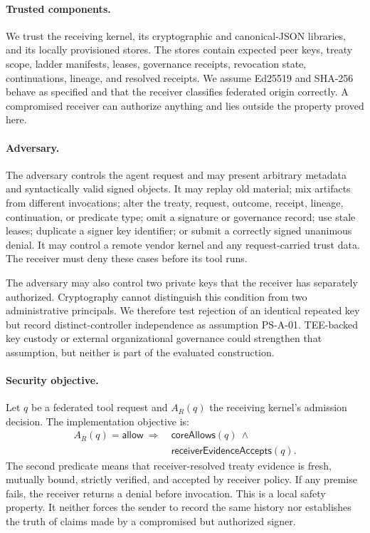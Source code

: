 \paragraph{Trusted components.}
We trust the receiving kernel, its cryptographic and canonical-JSON libraries, and its locally provisioned stores. The stores contain expected peer keys, treaty scope, ladder manifests, leases, governance receipts, revocation state, continuations, lineage, and resolved receipts. We assume Ed25519 and SHA-256 behave as specified and that the receiver classifies federated origin correctly. A compromised receiver can authorize anything and lies outside the property proved here.

\paragraph{Adversary.}
The adversary controls the agent request and may present arbitrary metadata and syntactically valid signed objects. It may replay old material; mix artifacts from different invocations; alter the treaty, request, outcome, receipt, lineage, continuation, or predicate type; omit a signature or governance record; use stale leases; duplicate a signer key identifier; or submit a correctly signed unanimous denial. It may control a remote vendor kernel and any request-carried trust data. The receiver must deny these cases before its tool runs.

The adversary may also control two private keys that the receiver has separately authorized. Cryptography cannot distinguish this condition from two administrative principals. We therefore test rejection of an identical repeated key but record distinct-controller independence as assumption \textsc{PS-A-01}. TEE-backed key custody or external organizational governance could strengthen that assumption, but neither is part of the evaluated construction.

\paragraph{Security objective.}
Let $q$ be a federated tool request and $A_R(q)$ the receiving kernel's admission decision. The implementation objective is:
\[
\begin{split}
A_R(q)=\mathsf{allow}\ \Longrightarrow\ &
  \mathsf{coreAllows}(q)\ \land\\
& \mathsf{receiverEvidenceAccepts}(q).
\end{split}
\]
The second predicate means that receiver-resolved treaty evidence is fresh,
mutually bound, strictly verified, and accepted by receiver policy.
If any premise fails, the receiver returns a denial before invocation. This is a local safety property. It neither forces the sender to record the same history nor establishes the truth of claims made by a compromised but authorized signer.
